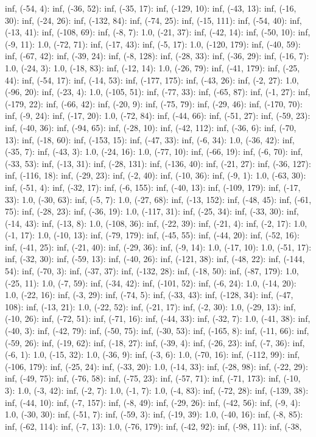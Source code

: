 \documentclass[parskip=half]{scrartcl}
\begin{document}
inf, (-54, 4): inf, (-36, 52): inf, (-35, 17): inf, (-129, 10): inf, (-43, 13): inf, (-16, 30): inf, (-24, 26): inf, (-132, 84): inf, (-74, 25): inf, (-15, 111): inf, (-54, 40): inf, (-13, 41): inf, (-108, 69): inf, (-8, 7): 1.0, (-21, 37): inf, (-42, 14): inf, (-50, 10): inf, (-9, 11): 1.0, (-72, 71): inf, (-17, 43): inf, (-5, 17): 1.0, (-120, 179): inf, (-40, 59): inf, (-67, 42): inf, (-39, 24): inf, (-8, 128): inf, (-28, 33): inf, (-36, 29): inf, (-16, 7): 1.0, (-24, 3): 1.0, (-18, 83): inf, (-12, 14): 1.0, (-26, 79): inf, (-41, 179): inf, (-25, 44): inf, (-54, 17): inf, (-14, 53): inf, (-177, 175): inf, (-43, 26): inf, (-2, 27): 1.0, (-96, 20): inf, (-23, 4): 1.0, (-105, 51): inf, (-77, 33): inf, (-65, 87): inf, (-1, 27): inf, (-179, 22): inf, (-66, 42): inf, (-20, 9): inf, (-75, 79): inf, (-29, 46): inf, (-170, 70): inf, (-9, 24): inf, (-17, 20): 1.0, (-72, 84): inf, (-44, 66): inf, (-51, 27): inf, (-59, 23): inf, (-40, 36): inf, (-94, 65): inf, (-28, 10): inf, (-42, 112): inf, (-36, 6): inf, (-70, 13): inf, (-18, 60): inf, (-153, 15): inf, (-47, 33): inf, (-6, 34): 1.0, (-36, 42): inf, (-35, 7): inf, (-43, 3): 1.0, (-24, 16): 1.0, (-77, 10): inf, (-66, 19): inf, (-6, 70): inf, (-33, 53): inf, (-13, 31): inf, (-28, 131): inf, (-136, 40): inf, (-21, 27): inf, (-36, 127): inf, (-116, 18): inf, (-29, 23): inf, (-2, 40): inf, (-10, 36): inf, (-9, 1): 1.0, (-63, 30): inf, (-51, 4): inf, (-32, 17): inf, (-6, 155): inf, (-40, 13): inf, (-109, 179): inf, (-17, 33): 1.0, (-30, 63): inf, (-5, 7): 1.0, (-27, 68): inf, (-13, 152): inf, (-48, 45): inf, (-61, 75): inf, (-28, 23): inf, (-36, 19): 1.0, (-117, 31): inf, (-25, 34): inf, (-33, 30): inf, (-14, 43): inf, (-13, 8): 1.0, (-108, 36): inf, (-22, 39): inf, (-21, 4): inf, (-2, 17): 1.0, (-1, 17): 1.0, (-10, 13): inf, (-79, 179): inf, (-45, 55): inf, (-44, 20): inf, (-52, 16): inf, (-41, 25): inf, (-21, 40): inf, (-29, 36): inf, (-9, 14): 1.0, (-17, 10): 1.0, (-51, 17): inf, (-32, 30): inf, (-59, 13): inf, (-40, 26): inf, (-121, 38): inf, (-48, 22): inf, (-144, 54): inf, (-70, 3): inf, (-37, 37): inf, (-132, 28): inf, (-18, 50): inf, (-87, 179): 1.0, (-25, 11): 1.0, (-7, 59): inf, (-34, 42): inf, (-101, 52): inf, (-6, 24): 1.0, (-14, 20): 1.0, (-22, 16): inf, (-3, 29): inf, (-74, 5): inf, (-33, 43): inf, (-128, 34): inf, (-47, 108): inf, (-13, 21): 1.0, (-22, 52): inf, (-21, 17): inf, (-2, 30): 1.0, (-29, 13): inf, (-10, 26): inf, (-72, 51): inf, (-71, 16): inf, (-44, 33): inf, (-32, 7): 1.0, (-41, 38): inf, (-40, 3): inf, (-42, 79): inf, (-50, 75): inf, (-30, 53): inf, (-165, 8): inf, (-11, 66): inf, (-59, 26): inf, (-19, 62): inf, (-18, 27): inf, (-39, 4): inf, (-26, 23): inf, (-7, 36): inf, (-6, 1): 1.0, (-15, 32): 1.0, (-36, 9): inf, (-3, 6): 1.0, (-70, 16): inf, (-112, 99): inf, (-106, 179): inf, (-25, 24): inf, (-33, 20): 1.0, (-14, 33): inf, (-28, 98): inf, (-22, 29): inf, (-49, 75): inf, (-76, 58): inf, (-75, 23): inf, (-57, 71): inf, (-71, 173): inf, (-10, 3): 1.0, (-3, 42): inf, (-2, 7): 1.0, (-1, 7): 1.0, (-4, 83): inf, (-72, 28): inf, (-139, 38): inf, (-44, 10): inf, (-7, 157): inf, (-8, 49): inf, (-29, 26): inf, (-42, 56): inf, (-9, 4): 1.0, (-30, 30): inf, (-51, 7): inf, (-59, 3): inf, (-19, 39): 1.0, (-40, 16): inf, (-8, 85): inf, (-62, 114): inf, (-7, 13): 1.0, (-76, 179): inf, (-42, 92): inf, (-98, 11): inf, (-38, 
\end{document}
